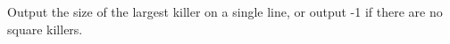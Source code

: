 Output the size of the largest killer on a single line, or output -1 if there are no square killers.
